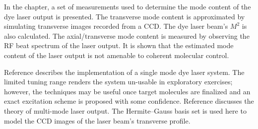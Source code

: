 In the chapter, a set of measurements used to determine the mode content of the dye laser output is presented.
The transverse mode content is approximated by simulating transverse images recorded from a CCD. The dye laser beam's $M^2$ is also calculated. The axial/transverse mode content is measured by observing the RF beat spectrum of the laser output. It is shown that the estimated mode content of the laser output is not amenable to coherent molecular control.


Reference \cite{Corless:1997a} describes the implementation of a single mode dye laser system. The limited tuning range renders the system un-usable in exploratory exercises; however, the techniques may be useful once target molecules are finalized and an exact excitation scheme is proposed with some confidence. Reference \cite{Siegman:1986a} discusses the theory of multi-mode laser output. The Hermite--Gauss basis set is used here to model the CCD images of the laser beam's transverse profile. 

